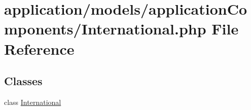 \hypertarget{_international_8php}{\section{application/models/application\-Components/\-International.php File Reference}
\label{_international_8php}
}
\subsection*{Classes}
\begin{DoxyCompactItemize}
\item 
class \hyperlink{class_international}{International}
\end{DoxyCompactItemize}

